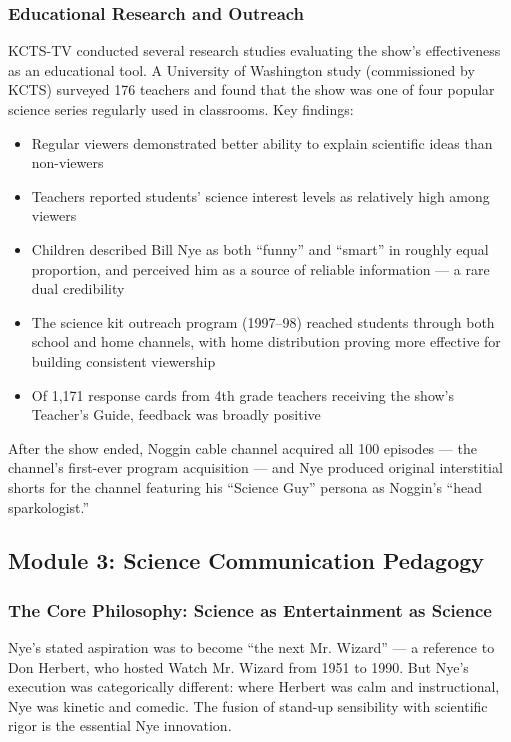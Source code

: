 \documentclass[11pt,letterpaper]{article}
\begin{document}
\subsubsection{Educational Research and Outreach}

KCTS-TV conducted several research studies evaluating the show's effectiveness as an educational tool. A University of Washington study (commissioned by KCTS) surveyed 176 teachers and found that the show was one of four popular science series regularly used in classrooms. Key findings:
\begin{itemize}[leftmargin=*]
  \item Regular viewers demonstrated better ability to explain scientific ideas than non-viewers
  \item Teachers reported students' science interest levels as relatively high among viewers
  \item Children described Bill Nye as both ``funny'' and ``smart'' in roughly equal proportion, and perceived him as a source of reliable information --- a rare dual credibility
  \item The science kit outreach program (1997--98) reached students through both school and home channels, with home distribution proving more effective for building consistent viewership
  \item Of 1,171 response cards from 4th grade teachers receiving the show's Teacher's Guide, feedback was broadly positive
\end{itemize}

After the show ended, Noggin cable channel acquired all 100 episodes --- the channel's first-ever program acquisition --- and Nye produced original interstitial shorts for the channel featuring his ``Science Guy'' persona as Noggin's ``head sparkologist.''

\subsection{Module 3: Science Communication Pedagogy}

\subsubsection{The Core Philosophy: Science as Entertainment as Science}

Nye's stated aspiration was to become ``the next Mr. Wizard'' --- a reference to Don Herbert, who hosted Watch Mr. Wizard from 1951 to 1990. But Nye's execution was categorically different: where Herbert was calm and instructional, Nye was kinetic and comedic. The fusion of stand-up sensibility with scientific rigor is the essential Nye innovation.
\end{document}
